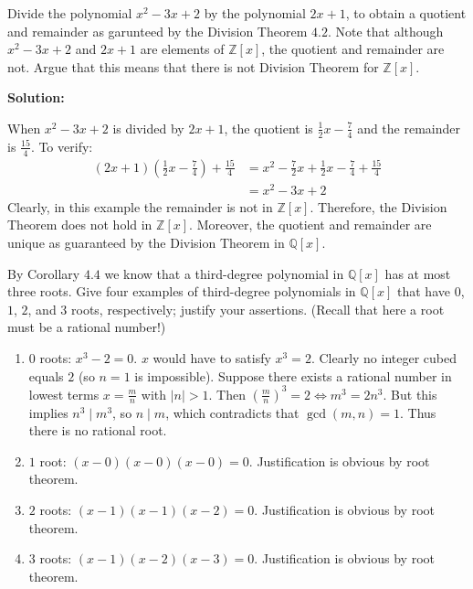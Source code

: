 \begin{tcolorbox}[title=Problem 2, breakable]
    Divide the polynomial $x^2 - 3x + 2$ by the polynomial $2x + 1$,
    to obtain a quotient and remainder as garunteed by the Division 
    Theorem $4.2$. Note that although $x^2 - 3x + 2$ and $2x + 1$ are 
    elements of $\mathbb{Z}[x]$, the quotient and remainder are not.
    Argue that this means that there is not Division Theorem for $\mathbb{Z}[x]$.
\end{tcolorbox}

\textbf{Solution:}

When $x^2 - 3x + 2$ is divided by $2x + 1$,
the quotient is $\frac{1}{2}x - \frac{7}{4}$ and the remainder is $\frac{15}{4}$.
To verify:
\begin{align*}
(2x + 1)\left(\frac{1}{2}x - \frac{7}{4}\right) + \frac{15}{4} 
&= x^2 - \frac{7}{2}x + \frac{1}{2}x - \frac{7}{4} + \frac{15}{4} \\
&= x^2 - 3x + 2
\end{align*}
Clearly, in this example the remainder is not in $\mathbb{Z}[x]$.
Therefore, the Division Theorem does not hold in $\mathbb{Z}[x]$.
Moreover, the quotient and remainder are unique as guaranteed by the Division Theorem in $\mathbb{Q}[x]$.

\begin{tcolorbox}[title=Problem 3, breakable]
    By Corollary $4.4$ we know that a third-degree polynomial in $\mathbb{Q}[x]$
    has at most three roots. Give four examples of third-degree polynomials in 
    $\mathbb{Q}[x]$ that have $0$, $1$, $2$, and $3$ roots, respectively; justify
    your assertions. (Recall that here a root must be a rational number!)
\end{tcolorbox}

\begin{enumerate}
     \item $0$ roots: $x^3 - 2 = 0$. $x$ would have to satisfy $x^3 = 2$.
           Clearly no integer cubed equals $2$ (so $n=1$ is impossible).
           Suppose there exists a rational number in lowest terms $x = \frac{m}{n}$ with $|n| > 1$.
           Then $(\frac{m}{n})^3 = 2 \iff m^3 = 2 n^3$.
           But this implies $n^3 \mid m^3$, so $n \mid m$, which contradicts that
           $\gcd(m,n)=1$. Thus there is no rational root.
     \item $1$ root:  $(x - 0)(x - 0)(x - 0) = 0$. Justification is obvious by root theorem.
     \item $2$ roots: $(x - 1)(x - 1)(x - 2) = 0$. Justification is obvious by root theorem.
     \item $3$ roots: $(x - 1)(x - 2)(x - 3) = 0$. Justification is obvious by root theorem.
\end{enumerate}

